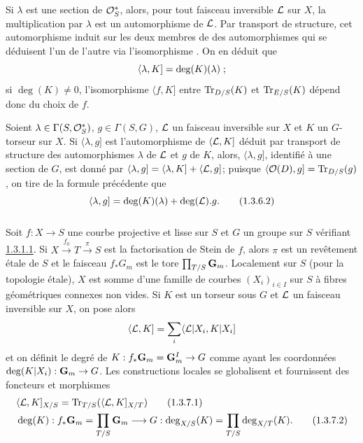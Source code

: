 \documentclass[10pt]{../fichiers-configuration-latex/smfart}
\begin{document}
Si $\lambda$ est une section de ${\mathcal O}^{\ast}_{S}$, alors, pour tout
faisceau inversible ${\mathcal L}$ sur $X$, la multiplication par
$\lambda$ est un automorphisme de ${\mathcal L}$. Par transport de
structure, cet automorphisme induit sur les deux membres de 
des automorphismes qui se déduisent l'un de l'autre via l'isomorphisme
. On en déduit que
$$
\langle \lambda, K]=\deg (K)(\lambda){}\;;
$$
si $\deg(K)\neq 0$, l'isomorphisme $\langle f,K]$ entre $\operatorname{Tr}_{D/S}(K)$ et
$\operatorname{Tr}_{E/S}(K)$ dépend donc du choix de $f$.

Soient $\lambda\in \Gamma(S,{\mathcal O}^{\ast}_{S})$, $g\in \Gamma(S,G)$,
${\mathcal L}$ un faisceau inversible sur $X$ et $K$ un $G$-torseur sur
$X$. Si $\langle \lambda,g]$ est l'automorphisme de $\langle {\mathcal L},K]$ déduit
par transport de structure des automorphismes $\lambda$ de
${\mathcal L}$ et $g$ de $K$, alors, $\langle \lambda,g]$, identifié à une
section de $G$, est donné par
$\langle \lambda,g]=\langle \lambda,K]+\langle {\mathcal L},g]$; puisque
$\langle {\mathcal O}(D),g]=\operatorname{Tr}_{D/S}(g)$, on tire de la formule précédente que
\begin{equation*}
\langle \lambda,g]=\deg(K)(\lambda)+\deg({\mathcal L}).g{}.\tag{1.3.6.2}
\end{equation*}

\subsubsection{}
Soit $f:X\rightarrow S$ une courbe projective et lisse sur $S$ et $G$
un groupe sur $S$ vérifiant \hyperref[XVIII.par1.3.1.1]{1.3.1.1}. Si
$X\xrightarrow{f_{0}}T\xrightarrow{\pi}S$ est la factorisation de
Stein de $f$, alors $\pi$ est un revêtement étale de $S$ et le
faisceau $f_{\ast}G_{m}$ est le tore
$\prod_{T/S}\mathbf{G}_{m}$. Localement sur $S$ (pour la topologie
étale), $X$ est somme d'une famille de courbes $(X_{i})_{i\in I}$ sur
$S$ à fibres géométriques connexes non vides. Si $K$ est un torseur
sous $G$ et ${\mathcal L}$ un faisceau inversible sur $X$, on pose
alors
$$
\langle {\mathcal L},K]=\sum_{i}\langle {\mathcal L}|X_{i},K|X_{i}]
$$
et on définit le degré de
$K:f_{\ast}\mathbf{G}_{m}=\mathbf{G}^{I}_{m}\rightarrow G$ comme ayant
les coordonnées $\deg(K|X_{i}):\mathbf{G}_{m}\rightarrow G$. Les
constructions locales se globalisent et fournissent\pageoriginale 
des foncteurs et morphismes
\begin{align*}
& \langle {\mathcal L},K]_{X/S}=\operatorname{Tr}_{T/S}(\langle {\mathcal L},K]_{X/T})\tag{1.3.7.1}\\
& \deg(K):f_{\ast}\mathbf{G}_{m}=\prod_{T/S}\mathbf{G}_{m}\longrightarrow G:\deg_{X/S}(K)=\prod_{T/S}\deg_{X/T}(K){}.\tag{1.3.7.2}
\end{align*}
\end{document}
